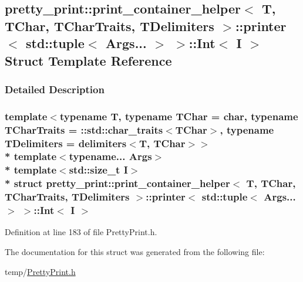 \hypertarget{structpretty__print_1_1print__container__helper_1_1printer_3_01std_1_1tuple_3_01Args_8_8_8_01_4_01_4_1_1Int}{}\subsection{pretty\+\_\+print\+:\+:print\+\_\+container\+\_\+helper$<$ T, T\+Char, T\+Char\+Traits, T\+Delimiters $>$\+:\+:printer$<$ std\+:\+:tuple$<$ Args... $>$ $>$\+:\+:Int$<$ I $>$ Struct Template Reference}
\label{structpretty__print_1_1print__container__helper_1_1printer_3_01std_1_1tuple_3_01Args_8_8_8_01_4_01_4_1_1Int}


\subsubsection{Detailed Description}
\subsubsection*{template$<$typename T, typename T\+Char = char, typename T\+Char\+Traits = \+::std\+::char\+\_\+traits$<$\+T\+Char$>$, typename T\+Delimiters = delimiters$<$\+T, T\+Char$>$$>$\\*
template$<$typename... Args$>$\\*
template$<$std\+::size\+\_\+t I$>$\\*
struct pretty\+\_\+print\+::print\+\_\+container\+\_\+helper$<$ T, T\+Char, T\+Char\+Traits, T\+Delimiters $>$\+::printer$<$ std\+::tuple$<$ Args... $>$ $>$\+::\+Int$<$ I $>$}



Definition at line 183 of file Pretty\+Print.\+h.



The documentation for this struct was generated from the following file\+:\begin{DoxyCompactItemize}
\item 
temp/\hyperlink{PrettyPrint_8h}{Pretty\+Print.\+h}\end{DoxyCompactItemize}
